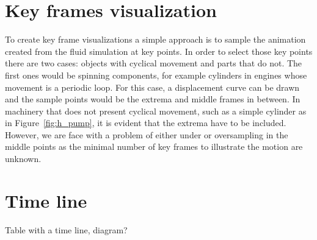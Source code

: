 
\section{Key frames visualization}

To create key frame visualizations a simple approach is to sample the animation created from the fluid simulation at key points.
In order to select those key points there are two cases: objects with cyclical movement and parts that do not.
The first ones would be spinning components, for example cylinders in engines whose movement is a periodic loop.
For this case, a displacement curve can be drawn and the sample points would be the extrema and middle frames in between.
In machinery that does not present cyclical movement, such as a simple cylinder as in Figure~\ref{fig:h_pump}, it is evident that the extrema have to be included.
However, we are face with a problem of either under or oversampling in the middle points as the minimal number of key frames to illustrate the motion are unknown. 

\section{Time line}

Table with a time line, diagram?